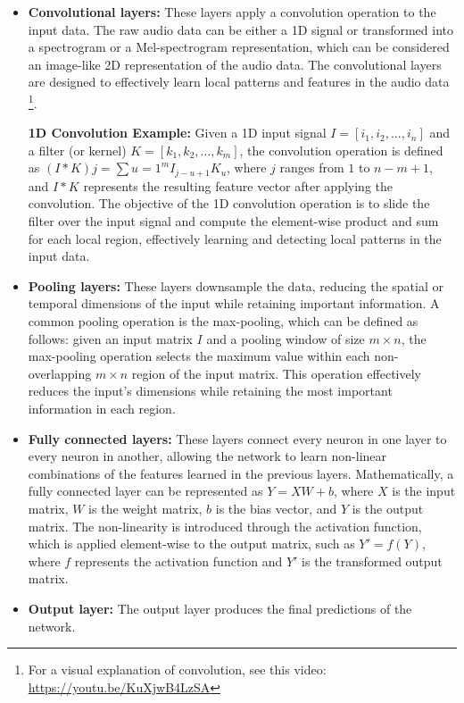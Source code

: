\begin{itemize}

\item \textbf{Convolutional layers:} These layers apply a convolution operation to the input data. The raw audio data can be either a 1D signal or transformed into a spectrogram or a Mel-spectrogram representation, which can be considered an image-like 2D representation of the audio data. The convolutional layers are designed to effectively learn local patterns and features in the audio data \footnote{For a visual explanation of convolution, see this video: \url{https://youtu.be/KuXjwB4LzSA}}.

\textbf{1D Convolution Example:} Given a 1D input signal $I = [i_1, i_2, ..., i_n]$ and a filter (or kernel) $K = [k_1, k_2, ..., k_m]$, the convolution operation is defined as $(I * K)j = \sum{u=1}^{m} I_{j-u+1} K_u$, where $j$ ranges from $1$ to $n-m+1$, and $I * K$ represents the resulting feature vector after applying the convolution. The objective of the 1D convolution operation is to slide the filter over the input signal and compute the element-wise product and sum for each local region, effectively learning and detecting local patterns in the input data.

\item \textbf{Pooling layers:} These layers downsample the data, reducing the spatial or temporal dimensions of the input while retaining important information. A common pooling operation is the max-pooling, which can be defined as follows: given an input matrix $I$ and a pooling window of size $m \times n$, the max-pooling operation selects the maximum value within each non-overlapping $m \times n$ region of the input matrix. This operation effectively reduces the input's dimensions while retaining the most important information in each region.
\vspace*{3mm}

\item \textbf{Fully connected layers:} These layers connect every neuron in one layer to every neuron in another, allowing the network to learn non-linear combinations of the features learned in the previous layers. Mathematically, a fully connected layer can be represented as $Y = XW + b$, where $X$ is the input matrix, $W$ is the weight matrix, $b$ is the bias vector, and $Y$ is the output matrix. The non-linearity is introduced through the activation function, which is applied element-wise to the output matrix, such as $Y' = f(Y)$, where $f$ represents the activation function and $Y'$ is the transformed output matrix.
\vspace*{3mm}

\item \textbf{Output layer:} The output layer produces the final predictions of the network.

\end{itemize}

